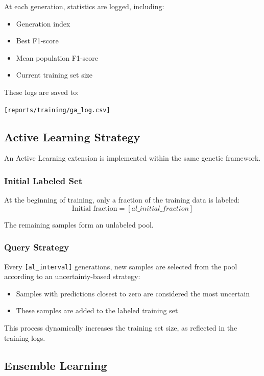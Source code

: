 \documentclass[12pt,a4paper]{article}
\begin{document}
At each generation, statistics are logged, including:
\begin{itemize}
    \item Generation index
    \item Best F1-score
    \item Mean population F1-score
    \item Current training set size
\end{itemize}

These logs are saved to:
\begin{center}
\texttt{[reports/training/ga\_log.csv]}
\end{center}

\subsection{Active Learning Strategy}

An Active Learning extension is implemented within the same genetic framework.

\subsubsection{Initial Labeled Set}

At the beginning of training, only a fraction of the training data is labeled:
\[
\text{Initial fraction} = [al\_initial\_fraction]
\]

The remaining samples form an unlabeled pool.

\subsubsection{Query Strategy}

Every \texttt{[al\_interval]} generations, new samples are selected from the pool according to an uncertainty-based strategy:
\begin{itemize}
    \item Samples with predictions closest to zero are considered the most uncertain
    \item These samples are added to the labeled training set
\end{itemize}

This process dynamically increases the training set size, as reflected in the training logs.

\subsection{Ensemble Learning}
\end{document}
